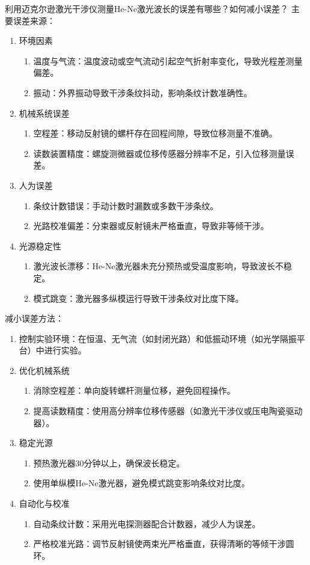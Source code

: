 \documentclass[dvipsnames, svgnames,a4paper,11pt]{article}
\begin{document}
\begin{question}
	利用迈克尔逊激光干涉仪测量He-Ne激光波长的误差有哪些？如何减小误差？
	\tcblower
	主要误差来源：
	\begin{enumerate}
		\item 环境因素\begin{enumerate}
			\item 温度与气流：温度波动或空气流动引起空气折射率变化，导致光程差测量偏差。
			\item 振动：外界振动导致干涉条纹抖动，影响条纹计数准确性。
		\end{enumerate}
		\item 机械系统误差\begin{enumerate}
			\item 空程差：移动反射镜的螺杆存在回程间隙，导致位移测量不准确。
			\item 读数装置精度：螺旋测微器或位移传感器分辨率不足，引入位移测量误差。
		\end{enumerate}
		\item 人为误差\begin{enumerate}
			\item 条纹计数错误：手动计数时漏数或多数干涉条纹。
			\item 光路校准偏差：分束器或反射镜未严格垂直，导致非等倾干涉。
		\end{enumerate}
		\item 光源稳定性\begin{enumerate}
			\item 激光波长漂移：He-Ne激光器未充分预热或受温度影响，导致波长不稳定。
			\item 模式跳变：激光器多纵模运行导致干涉条纹对比度下降。
		\end{enumerate}
	\end{enumerate}
	减小误差方法：
	\begin{enumerate}
		\item 控制实验环境：在恒温、无气流（如封闭光路）和低振动环境（如光学隔振平台）中进行实验。
		\item 优化机械系统\begin{enumerate}
			\item 消除空程差：单向旋转螺杆测量位移，避免回程操作。
			\item 提高读数精度：使用高分辨率位移传感器（如激光干涉仪或压电陶瓷驱动器）。
		\end{enumerate}
		\item 稳定光源\begin{enumerate}
			\item 预热激光器30分钟以上，确保波长稳定。
			\item 使用单纵模He-Ne激光器，避免模式跳变影响条纹对比度。
		\end{enumerate}
		\item 自动化与校准\begin{enumerate}
			\item 自动条纹计数：采用光电探测器配合计数器，减少人为误差。
			\item 严格校准光路：调节反射镜使两束光严格垂直，获得清晰的等倾干涉圆环。
		\end{enumerate}
	\end{enumerate}
\end{question}
\end{document}
